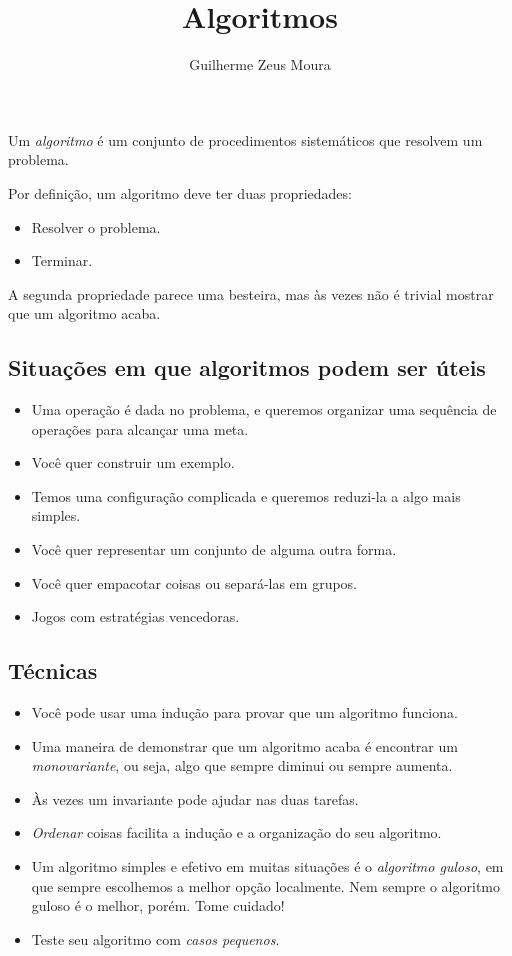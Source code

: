 \documentclass[10pt,a4paper]{article}
\title{Algoritmos}
\author{Guilherme Zeus Moura}
\begin{document}
	
	\zeustitle
	\begin{defn}
		Um \emph{algoritmo} é um conjunto de procedimentos sistemáticos que resolvem um problema.
	\end{defn}
	
	Por definição, um algoritmo deve ter duas propriedades:
	\begin{itemize}
		\item Resolver o problema.
		\item Terminar.
	\end{itemize}

	A segunda propriedade parece uma besteira, mas às vezes não é trivial mostrar que um algoritmo acaba.
	\subsection*{Situações em que algoritmos podem ser úteis}
	
	\begin{itemize}
		\item Uma operação é dada no problema, e queremos organizar uma sequência de operações para alcançar uma meta.
		\item Você quer construir um exemplo.
		\item Temos uma configuração complicada e queremos reduzi-la a algo mais simples.
		\item Você quer representar um conjunto de alguma outra forma.
		\item Você quer empacotar coisas ou separá-las em grupos.
		\item Jogos com estratégias vencedoras.
	\end{itemize}

	\subsection*{Técnicas}

	\begin{itemize}
		\item Você pode usar uma indução para provar que um algoritmo funciona.
		\item Uma maneira de demonstrar que um algoritmo acaba é encontrar um \emph{monovariante}, ou seja, algo que sempre diminui ou sempre aumenta.
		\item Às vezes um invariante pode ajudar nas duas tarefas.
		\item \emph{Ordenar} coisas facilita a indução e a organização do seu algoritmo.
		\item Um algoritmo simples e efetivo em muitas situações é o \emph{algoritmo guloso}, em que sempre escolhemos a melhor opção localmente. Nem sempre o algoritmo guloso é o melhor, porém. Tome cuidado!
		\item Teste seu algoritmo com \emph{casos pequenos}.
	\end{itemize}
\end{document}
